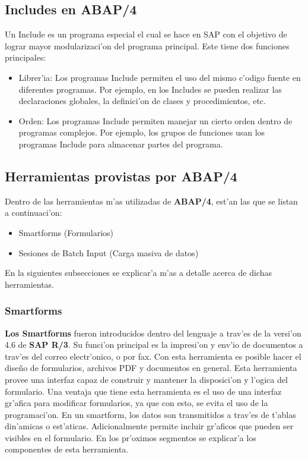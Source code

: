 \subsection{Includes en ABAP/4}
	Un Include es un programa especial el cual se hace en SAP con el objetivo de lograr mayor modularizaci'on del programa principal.
\newline
\newline
	Este tiene dos funciones principales:
\begin{itemize}
\item Librer'ia: Los programas Include permiten el uso del mismo c'odigo fuente en diferentes programas. Por ejemplo, en los Includes se pueden realizar las declaraciones globales, la definici'on de clases y procedimientos, etc.
\item Orden: Los programas Include permiten manejar un cierto orden dentro de programas complejos. Por ejemplo, los grupos de funciones usan los programas Include para almacenar partes del programa. 
\end{itemize}
	

\subsection{Herramientas provistas por ABAP/4}
	Dentro de las herramientas m'as utilizadas de \textbf{ABAP/4}, est'an las que se listan a continuaci'on:
\begin{itemize}
\item Smartforms (Formularios)
\item Sesiones de Batch Input (Carga masiva de datos)
\end{itemize} 
	En la siguientes subsecciones se explicar'a m'as a detalle acerca de dichas herramientas.
	
\subsubsection{Smartforms}
	\textbf{Los Smartforms} fueron introducidos dentro del lenguaje a trav'es de la versi'on 4.6 de \textbf{SAP R/3}. Su funci'on principal es la impresi'on y env'io de documentos a trav'es del correo electr'onico, o por fax. 
\newline
\newline
	Con esta herramienta es posible hacer el dise\~no de formularios, archivos PDF y documentos en general. 
	Esta herramienta provee una interfaz capaz de construir y mantener la disposici'on y l'ogica del formulario.
	Una ventaja que tiene esta herramienta es el uso  de una interfaz gr'afica para modificar formularios, ya que con esto, se evita el uso de la programaci'on.
\newline 
\newline
	En un smartform, los datos son transmitidos a trav'es de t'ablas din'amicas o est'aticas. Adicionalmente permite incluir gr'aficos que pueden ser visibles en el formulario. En los pr'oximos segmentos se explicar'a los componentes de esta herramienta.
	
